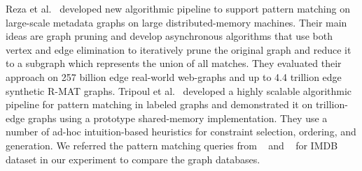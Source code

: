 Reza et al.~\cite{reza2018prunejuice} developed new algorithmic pipeline to support pattern matching on large-scale metadata graphs on large distributed-memory machines. Their main ideas are graph pruning and develop asynchronous algorithms that use both vertex and edge elimination to iteratively prune the original graph and reduce it to a subgraph which represents the union of all matches. They evaluated their approach on 257 billion edge real-world web-graphs and up to 4.4 trillion edge synthetic R-MAT graphs. 
Tripoul et al.~\cite{tripoulthere} developed a highly scalable algorithmic pipeline for pattern matching in labeled graphs and demonstrated it on trillion-edge graphs using a prototype
shared-memory implementation. They use a number of ad-hoc intuition-based heuristics for constraint selection, ordering, and generation. We referred the pattern matching queries from ~\cite{reza2018prunejuice} and ~\cite{tripoulthere}  for IMDB dataset in our experiment to compare the graph databases.
